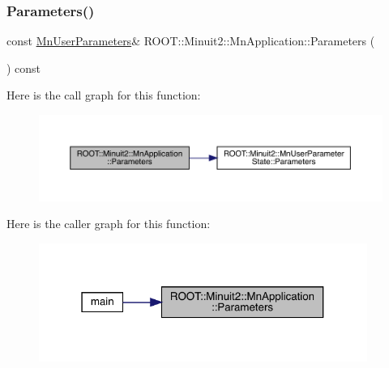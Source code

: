 \subsubsection{\texorpdfstring{Parameters()}{Parameters()}\hspace{0.1cm}{\footnotesize\ttfamily [1/3]}}
{\footnotesize\ttfamily const \mbox{\hyperlink{classROOT_1_1Minuit2_1_1MnUserParameters}{Mn\+User\+Parameters}}\& R\+O\+O\+T\+::\+Minuit2\+::\+Mn\+Application\+::\+Parameters (\begin{DoxyParamCaption}{ }\end{DoxyParamCaption}) const\hspace{0.3cm}{\ttfamily [inline]}}

Here is the call graph for this function\+:
\nopagebreak
\begin{figure}[H]
\begin{center}
\leavevmode
\includegraphics[width=350pt]{df/dd5/classROOT_1_1Minuit2_1_1MnApplication_a8a6af4bd7d2f8af8524bca7a67b2f62d_cgraph}
\end{center}
\end{figure}
Here is the caller graph for this function\+:
\nopagebreak
\begin{figure}[H]
\begin{center}
\leavevmode
\includegraphics[width=304pt]{df/dd5/classROOT_1_1Minuit2_1_1MnApplication_a8a6af4bd7d2f8af8524bca7a67b2f62d_icgraph}
\end{center}
\end{figure}
\mbox{\label{classROOT_1_1Minuit2_1_1MnApplication_a8a6af4bd7d2f8af8524bca7a67b2f62d}} 
